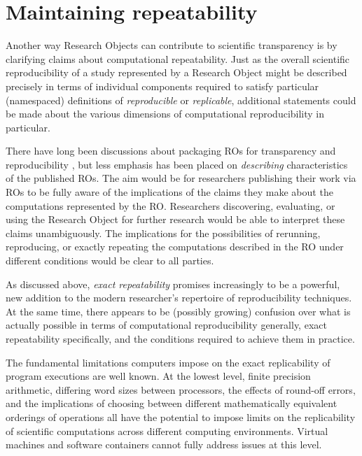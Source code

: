 \section{Maintaining repeatability}\label{sec-limitations}

Another way Research Objects can contribute to scientific transparency is by
	clarifying claims about computational repeatability.
Just as the overall scientific reproducibility of a study represented by a Research Object
	might be described precisely in terms of individual components required to
	satisfy particular (namespaced) definitions of \emph{reproducible} or \emph{replicable},
	additional statements could be made about the various dimensions of computational
	reproducibility in particular.

There have long been discussions about packaging ROs for transparency and
    reproducibility \cite{claerbout1992, gentleman2007, peng2011}, but less emphasis has been
    placed on \emph{describing} characteristics of the published ROs. The aim would be for researchers
    publishing their work via ROs to be fully aware of the implications of the claims they make about
    the computations represented by the RO.
Researchers discovering, evaluating, or using the Research Object for further research
	 would be able to interpret these claims unambiguously.
The implications for the possibilities of rerunning, reproducing, or exactly repeating the
	computations described in the RO under different conditions would be clear
	to all parties.

As discussed above, \emph{exact repeatability} promises increasingly to be a powerful,
	new addition to the modern researcher's repertoire of reproducibility techniques.
At the same time, there appears to be (possibly growing) confusion over what is actually
	possible in terms of computational reproducibility generally, exact repeatability
	specifically, and the conditions required to achieve them in practice.

The fundamental limitations computers impose on the exact replicability of program executions
	are well known.
At the lowest level, finite precision arithmetic, differing word sizes between processors,
	the effects of round-off errors, and the implications of choosing between different
	mathematically equivalent orderings of operations all have the potential to
	impose limits on the replicability of scientific computations across different computing environments.
Virtual machines and software containers cannot fully address issues at this level.

